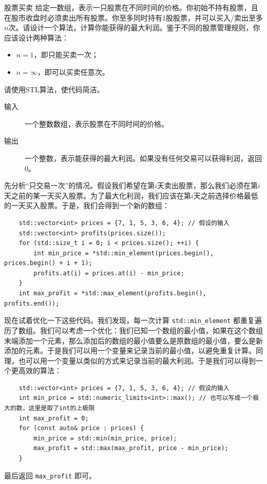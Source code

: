 \begin{example}{股票买卖}{}
    给定一数组，表示一只股票在不同时间的价格。你初始不持有股票，且在股市收盘时必须卖出所有股票。你至多同时持有1股股票，并可以买入/卖出至多$n$次。请设计一个算法，计算你能获得的最大利润。鉴于不同的股票管理规则，你应该设计两种算法：
    \begin{itemize}
        \item $n=1$，即只能买卖一次；
        \item $n=\infty$，即可以买卖任意次。
    \end{itemize}
    请使用STL算法，使代码简洁。

    \begin{description}
        \item[输入] 一个整数数组，表示股票在不同时间的价格。
        \item[输出] 一个整数，表示能获得的最大利润。如果没有任何交易可以获得利润，返回0。
    \end{description}
    \tcblower

    先分析“只交易一次”的情况。假设我们希望在第$i$天卖出股票，那么我们必须在第$i$天之前的某一天买入股票。为了最大化利润，我们应该在第$i$天之前选择价格最低的一天买入股票。于是，我们会得到一个新的数组：
    \begin{verbatim}
    std::vector<int> prices = {7, 1, 5, 3, 6, 4}; // 假设的输入
    std::vector<int> profits(prices.size());
    for (std::size_t i = 0; i < prices.size(); ++i) {
        int min_price = *std::min_element(prices.begin(), prices.begin() + i + 1);
        profits.at(i) = prices.at(i) - min_price;
    }
    int max_profit = *std::max_element(profits.begin(), profits.end());
    \end{verbatim}
    现在试着优化一下这些代码。我们发现，每一次计算 \verb|std::min_element| 都重复遍历了数组。我们可以考虑一个优化：我们已知一个数组的最小值，如果在这个数组末端添加一个元素，那么添加后的数组的最小值要么是原数组的最小值，要么是新添加的元素。于是我们可以用一个变量来记录当前的最小值，以避免重复计算。同理，也可以用一个变量以类似的方式来记录当前的最大利润。于是我们可以得到一个更高效的算法：
    \begin{verbatim}
    std::vector<int> prices = {7, 1, 5, 3, 6, 4}; // 假设的输入
    int min_price = std::numeric_limits<int>::max(); // 也可以写成一个极大的数，这里是取了int的上极限
    int max_profit = 0;
    for (const auto& price : prices) {
        min_price = std::min(min_price, price);
        max_profit = std::max(max_profit, price - min_price);
    }
    \end{verbatim}
    最后返回 \verb|max_profit| 即可。


\end{example}
